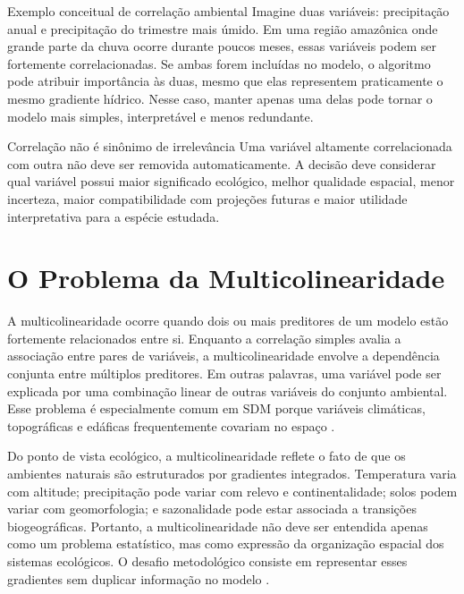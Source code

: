 \begin{caixaconceitual}{Exemplo conceitual de correlação ambiental}
	Imagine duas variáveis: precipitação anual e precipitação do trimestre mais úmido. Em uma região amazônica onde grande parte da chuva ocorre durante poucos meses, essas variáveis podem ser fortemente correlacionadas. Se ambas forem incluídas no modelo, o algoritmo pode atribuir importância às duas, mesmo que elas representem praticamente o mesmo gradiente hídrico. Nesse caso, manter apenas uma delas pode tornar o modelo mais simples, interpretável e menos redundante.
\end{caixaconceitual}

\begin{caixaatencao}{Correlação não é sinônimo de irrelevância}
	Uma variável altamente correlacionada com outra não deve ser removida automaticamente. A decisão deve considerar qual variável possui maior significado ecológico, melhor qualidade espacial, menor incerteza, maior compatibilidade com projeções futuras e maior utilidade interpretativa para a espécie estudada.
\end{caixaatencao}

\section{O Problema da Multicolinearidade}

A multicolinearidade ocorre quando dois ou mais preditores de um modelo estão fortemente relacionados entre si. Enquanto a correlação simples avalia a associação entre pares de variáveis, a multicolinearidade envolve a dependência conjunta entre múltiplos preditores. Em outras palavras, uma variável pode ser explicada por uma combinação linear de outras variáveis do conjunto ambiental. Esse problema é especialmente comum em SDM porque variáveis climáticas, topográficas e edáficas frequentemente covariam no espaço \parencite{dormann2013collinearity,guisan2017habitat}.

Do ponto de vista ecológico, a multicolinearidade reflete o fato de que os ambientes naturais são estruturados por gradientes integrados. Temperatura varia com altitude; precipitação pode variar com relevo e continentalidade; solos podem variar com geomorfologia; e sazonalidade pode estar associada a transições biogeográficas. Portanto, a multicolinearidade não deve ser entendida apenas como um problema estatístico, mas como expressão da organização espacial dos sistemas ecológicos. O desafio metodológico consiste em representar esses gradientes sem duplicar informação no modelo \parencite{franklin2010mapping,elith2009species}.

